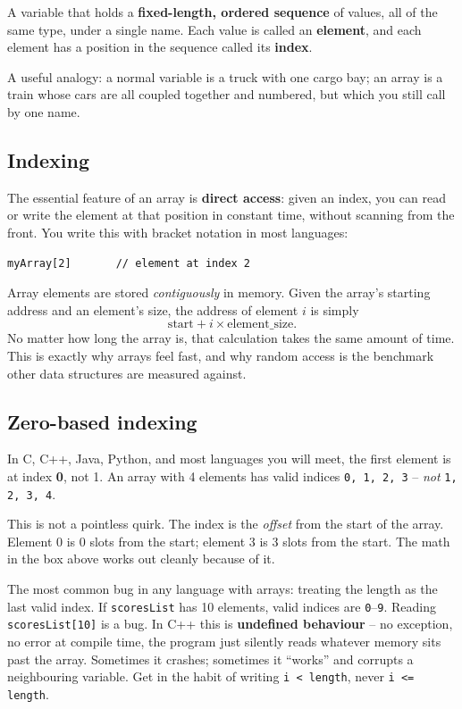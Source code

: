 \documentclass[11pt]{article}
\begin{document}
\begin{defnbox}[Array]
A variable that holds a \textbf{fixed-length, ordered sequence} of
values, all of the same type, under a single name. Each value is called
an \textbf{element}, and each element has a position in the sequence
called its \textbf{index}.
\end{defnbox}

A useful analogy: a normal variable is a truck with one cargo bay; an
array is a train whose cars are all coupled together and numbered, but
which you still call by one name.

\subsection{Indexing}

The essential feature of an array is \textbf{direct access}: given an
index, you can read or write the element at that position in constant
time, without scanning from the front. You write this with bracket
notation in most languages:
\begin{lstlisting}
myArray[2]       // element at index 2
\end{lstlisting}

\begin{ideabox}
Array elements are stored \emph{contiguously} in memory. Given the
array's starting address and an element's size, the address of element
$i$ is simply
\[
\text{start} + i \times \text{element\_size}.
\]
No matter how long the array is, that calculation takes the same
amount of time. This is exactly why arrays feel fast, and why random
access is the benchmark other data structures are measured against.
\end{ideabox}

\subsection{Zero-based indexing}

In C, C++, Java, Python, and most languages you will meet, the first
element is at index \textbf{0}, not 1. An array with 4 elements has
valid indices \texttt{0, 1, 2, 3} -- \emph{not} \texttt{1, 2, 3, 4}.

This is not a pointless quirk. The index is the \emph{offset} from the
start of the array. Element 0 is 0 slots from the start; element 3 is 3
slots from the start. The math in the box above works out cleanly
because of it.

\begin{warnbox}
The most common bug in any language with arrays: treating the length as
the last valid index. If \texttt{scoresList} has 10 elements, valid
indices are \texttt{0}--\texttt{9}. Reading \texttt{scoresList[10]} is
a bug.
In C++ this is \textbf{undefined behaviour} -- no exception, no error
at compile time, the program just silently reads whatever memory sits
past the array. Sometimes it crashes; sometimes it ``works'' and
corrupts a neighbouring variable. Get in the habit of writing
\texttt{i < length}, never \texttt{i <= length}.
\end{warnbox}
\end{document}
